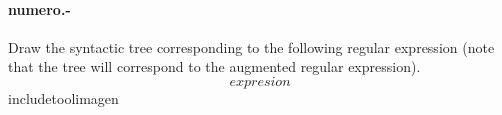 

\paragraph{{numero}.-}\label{p{numero}}
Draw the syntactic tree corresponding to the following regular expression (note that the tree will correspond to the augmented regular expression).
\[
    {expresion}
\]
{includetool}{{imagen}}

